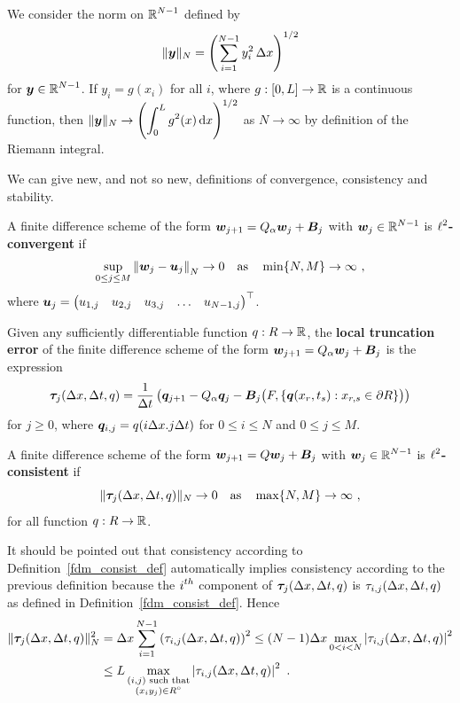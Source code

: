 We consider the norm on $\displaystyle \mathbb{R}^{N-1}$ defined by
\[
  \| \bm{y} \|_N = \left(\sum_{i=1}^{N-1} y_i^2\,\Delta{x}\right)^{1/2}
\]
for $\displaystyle \bm{y} \in \mathbb{R}^{N-1}$.  If $y_i = g(x_i)$ for all $i$, where
$g:[0,L]\to \mathbb{R}$ is a continuous function, then
$\displaystyle \|\bm{y} \|_N \to \left( \int_0^L g^2(x)\,\mathrm{d}x\right)^{1/2}$
as $N \to \infty$ by definition of the Riemann integral.

We can give new, and not so new, definitions of convergence,
consistency and stability.

\begin{defn} \label{ell2ConvDefN2}
A finite difference scheme of the form
$\bm{w}_{j+1} = Q_\alpha\bm{w}_j + \bm{B}_j$
with $\displaystyle \bm{w}_j \in \mathbb{R}^{N-1}$ is
{\bfseries $\displaystyle \ell^2$-convergent}
 if
\[
  \sup_{0\leq j \leq M} \left\| \bm{w}_j - \bm{u}_j \right\|_N \to 0
  \quad \text{as} \quad \min\{N,M\} \to \infty \ ,
\]
where $\displaystyle \bm{u}_j = \begin{pmatrix}
u_{1,j} & u_{2,j} & u_{3,j} & \ldots & u_{N-1,j} \end{pmatrix}^\top$.
\end{defn}

\begin{defn} \label{fdm_consist_defN2}
Given any sufficiently differentiable function $q:R \to \mathbb{R}$,
the {\bfseries local truncation error} of the finite difference scheme of the form
$\bm{w}_{j+1} = Q_\alpha\bm{w}_j + \bm{B}_j$ is the expression
\[
\bm{\tau}_j(\Delta{x},\Delta{t},q) = \frac{1}{\Delta{t}}
\left(\bm{q}_{j+1} - Q_\alpha \bm{q}_j -
\bm{B}_j\big(F, \{ \bm{q}(x_r,t_s) :x_{r,s} \in \partial R\} \big) \right)
\]
for $j\geq 0$, where $\bm{q}_{i,j} = q(i\Delta{x}.j\Delta{t})$ for $0\leq i\leq N$
and $0\leq j \leq M$.

A finite difference scheme of the form $\bm{w}_{j+1} = Q\bm{w}_j + \bm{B}_j$
with $\displaystyle \bm{w}_j \in \mathbb{R}^{N-1}$ is
{\bfseries $\displaystyle \ell^2$-consistent}
 if
\[
\| \bm{\tau}_j(\Delta{x},\Delta{t},q) \|_N \to 0 \quad \text{as} \quad
\max\{N,M\} \to \infty \ ,
\]
for all function $q:R \to \mathbb{R}$.
\end{defn}

\begin{rmk}
It should be pointed out that consistency according to
Definition~\ref{fdm_consist_def} automatically implies
consistency according to the previous definition because the
$\displaystyle i^{th}$ component of $\bm{\tau}_j(\Delta{x},\Delta{t},q)$ is
$\tau_{i,j}(\Delta{x},\Delta{t},q)$ as defined in 
Definition~\ref{fdm_consist_def}.  Hence
\begin{align*}
\| \bm{\tau}_j(\Delta{x},\Delta{t},q) \|_N^2
&= \Delta{x} \sum_{i=1}^{N-1} \left(\tau_{i,j} (\Delta{x},\Delta{t},q)\right)^2
\leq (N-1)\Delta{x} \max_{0<i<N} \left|\tau_{i,j} (\Delta{x},\Delta{t},q)\right|^2 \\
&\leq L \max_{\substack{(i,j) \text{ such that}\\(x_iy_j) \in R^\circ}}
\left|\tau_{i,j} (\Delta{x},\Delta{t},q)\right|^2 \ .
\end{align*}
\label{rmk_consist_defN2}
\end{rmk}

